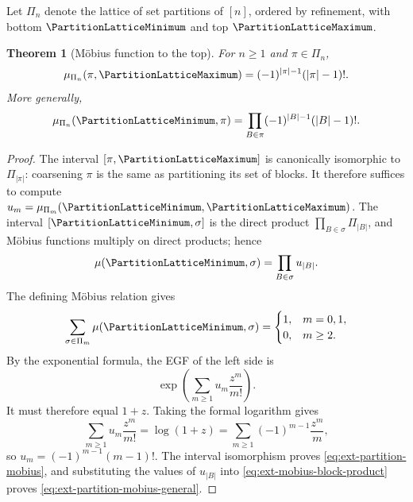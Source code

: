 \documentclass[11pt,a4paper,oneside,openany]{book}
\newtheorem{theorem}{Theorem}[chapter]
\theoremstyle{definition}
\theoremstyle{remark}
\begin{document}
Let \(\Pi_n\) denote the lattice of set partitions of \([n]\), ordered by
refinement, with bottom \(\PartitionLatticeMinimum\) and top \(\PartitionLatticeMaximum\).

\begin{theorem}[M\"obius function to the top]
\label{thm:ext-partition-mobius}
For \(n\ge1\) and \(\pi\in\Pi_n\),
\begin{equation}\label{eq:ext-partition-mobius}
 \mu_{\Pi_n}(\pi,\PartitionLatticeMaximum)
 =(-1)^{|\pi|-1}(|\pi|-1)!.
\end{equation}
More generally,
\begin{equation}\label{eq:ext-partition-mobius-general}
 \mu_{\Pi_n}(\PartitionLatticeMinimum,\pi)
 =\prod_{B\in\pi}(-1)^{|B|-1}(|B|-1)!.
\end{equation}
\end{theorem}
\begin{proof}
The interval \([\pi,\PartitionLatticeMaximum]\) is canonically isomorphic to
\(\Pi_{|\pi|}\): coarsening \(\pi\) is the same as partitioning its set of
blocks.  It therefore suffices to compute
\(u_m=\mu_{\Pi_m}(\PartitionLatticeMinimum,\PartitionLatticeMaximum)\).  The interval
\([\PartitionLatticeMinimum,\sigma]\) is the direct product
\(\prod_{B\in\sigma}\Pi_{|B|}\), and M\"obius functions multiply on direct
products; hence
\begin{equation}\label{eq:ext-mobius-block-product}
 \mu(\PartitionLatticeMinimum,\sigma)=\prod_{B\in\sigma}u_{|B|}.
\end{equation}
The defining M\"obius relation gives
\[
 \sum_{\sigma\in\Pi_m}\mu(\PartitionLatticeMinimum,\sigma)
 =\begin{cases}1,&m=0,1,\\0,&m\ge2.\end{cases}
\]
By the exponential formula, the EGF of the left side is
\[
 \exp\!\left(\sum_{m\ge1}u_m\frac{z^m}{m!}\right).
\]
It must therefore equal \(1+z\).  Taking the formal logarithm gives
\[
 \sum_{m\ge1}u_m\frac{z^m}{m!}=\log(1+z)
 =\sum_{m\ge1}(-1)^{m-1}\frac{z^m}{m},
\]
so \(u_m=(-1)^{m-1}(m-1)!\).  The interval isomorphism proves
\eqref{eq:ext-partition-mobius}, and substituting the values of \(u_{|B|}\)
into \eqref{eq:ext-mobius-block-product} proves
\eqref{eq:ext-partition-mobius-general}.
\end{proof}
\end{document}
